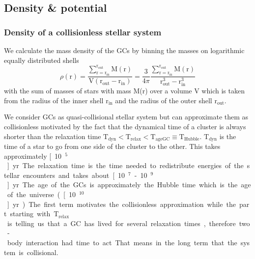 \subsection{Density \& potential}\label{sec:dens_pot_theory}
\subsubsection{Density of a collisionless stellar system}\label{sec:density}
We calculate the mass density of the \acp{GC} by binning the masses on logarithmic equally distributed shells
\begin{equation}\label{eq:density}
\rho(\mathrm{r})=\frac{\sum_{\mathrm{r=r_{in}}}^{\mathrm{r_{out}}}\mathrm{M(r)}}{\mathrm{V(r_{out}-r_{in})}}=\frac{3}{4\pi}\frac{\sum_{\mathrm{r=r_{in}}}^{\mathrm{r_{out}}}\mathrm{M(r)}}{\mathrm{r_{out}^3-r_{in}^3}}
\end{equation} 
with the sum of masses of stars with mass M(r) over a volume V which is taken from the radius of the inner shell \(\mathrm{r_{in}}\) and the radius of the outer shell \(\mathrm{r_{out}}\). 
\par We consider \acp{GC} as quasi-collisional stellar system but can approximate them as collisionless motivated by the fact that the dynamical time of a cluster is always shorter than the relaxation time \(\mathrm{T_{dyn} < T_{relax} < T_{ageGC} \equiv T_{Hubble}}\). \(\mathrm{T_{dyn}}\) is the time of a star to go from one side of the cluster to the other. This takes approximately \unit[10\(^5\)]{yr}. The relaxation time is the time needed to redistribute energies of the stellar encounters and takes about \unit[10\(^7\) - 10\(^9\)]{yr}. The age of the \acp{GC} is approximately the Hubble time which is the age of the universe (\unit[10\(^{10}\)]{yr}). The first term motivates the collisionless approximation while the part starting with \(\mathrm{T_{relax}}\) is telling us that a \ac{GC} has lived for several relaxation times, therefore two-body interaction had time to act. That means in the long term that the system is collisional. 
